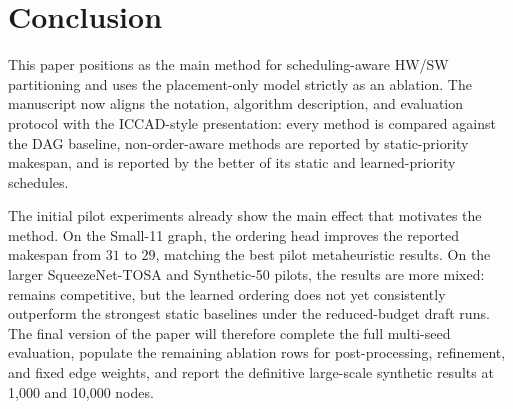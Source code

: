 \section{Conclusion}
\label{sec:conclusion}
This paper positions \diffgnnorder as the main method for scheduling-aware HW/SW partitioning and uses the placement-only \diffgnn model strictly as an ablation. The manuscript now aligns the notation, algorithm description, and evaluation protocol with the ICCAD-style presentation: every method is compared against the DAG baseline, non-order-aware methods are reported by static-priority makespan, and \diffgnnorder is reported by the better of its static and learned-priority schedules.

The initial pilot experiments already show the main effect that motivates the method. On the Small-11 graph, the ordering head improves the reported makespan from $31$ to $29$, matching the best pilot metaheuristic results. On the larger SqueezeNet-TOSA and Synthetic-50 pilots, the results are more mixed: \diffgnnorder remains competitive, but the learned ordering does not yet consistently outperform the strongest static baselines under the reduced-budget draft runs. The final version of the paper will therefore complete the full multi-seed evaluation, populate the remaining ablation rows for post-processing, refinement, and fixed edge weights, and report the definitive large-scale synthetic results at 1,000 and 10,000 nodes.
